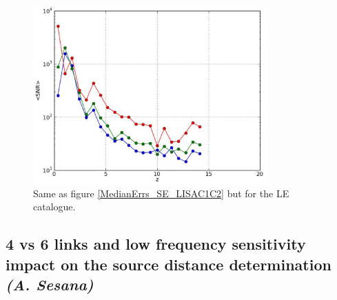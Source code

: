\documentclass{iopart}
\begin{document}
\begin{figure}[H]
\center
   \includegraphics[width=0.8\textwidth]{FigSMBHPhenomAEI/MedianSNR_LE_LISAC1C2.eps}
\caption{Same as figure \ref{MedianErrs_SE_LISAC1C2} but for the LE catalogue.
\label{MedianSNR_LE_LISAC1C2} } 
\end{figure}







\subsection{4 vs 6 links and low frequency sensitivity impact on the source distance determination {\it (A. Sesana)} }
\label{SS:SMBH4vs6link}
\end{document}
